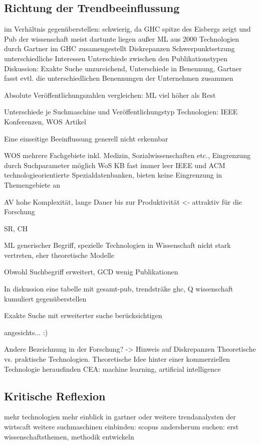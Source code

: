 \subsection{Richtung der Trendbeeinflussung}

im Verhältnis gegenüberstellen: schwierig, da GHC spitze des Eisbergs zeigt und Pub der wissenschaft meist dartunte liegen außer ML
aus 2000 Technologien durch Gartner im GHC zusamengestellt
Diskrepanzen Schwerpunktsetzung
unterschiedliche Interessen
Unterschiede zwischen den Publikationstypen
Diskussion:
Exakte Suche unzureichend, Unterschiede in Benennung, Gartner fasst evtl. die unterschiedlichen Benennungen der Unternehmen zusammen

Absolute Veröffentlichungszahlen vergleichen: ML viel höher als Rest


Unterschiede je Suchmaschine und Veröffentlichungstyp
Technologien: IEEE Konferenzen, WOS Artikel

Eine einseitige Beeinflussung generell nicht erkennbar

WOS mehrere Fachgebiete inkl. Medizin, Sozialwissenschaften etc., Eingrenzung durch Suchparameter möglich
WoS KB fast immer leer
IEEE und ACM technologieorientierte Spezialdatenbanken, bieten keine Eingrenzung in Themengebiete an

AV hohe Komplexität, lange Dauer bis zur Produktivität <- attraktiv für die Forschung

SR, CH

ML generischer Begriff, spezielle Technologien in Wissenschaft nicht stark vertreten, eher theoretische Modelle

Obwohl Suchbegriff erweitert, GCD wenig Publikationen

In diskussion eine tabelle mit gesamt-pub, trendsträke ghc, Q wissenschaft kumuliert gegenüberstellen

Exakte Suche mit erweiterter suche berücksichtigen

angesichts... :)

Andere Bezeichnung in der Forschung? -> Hinweis auf Diskrepanzen
Theoretische vs. praktische Technologien. Theoretische Idee hinter einer kommerziellen Technologie herausfinden
CEA: machine learning, artificial intelligence

\subsection{Kritische Reflexion}
mehr technologien
mehr einblick in gartner oder weitere trendanalysten der wirtscaft
weitere suchmaschinen einbinden: scopus
andersherum suchen: erst wissenschaftsthemen, methodik entwickeln